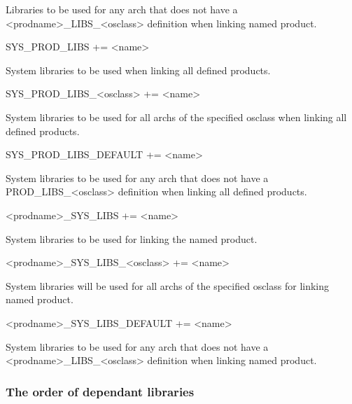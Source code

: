 \begin{description}
Libraries to be used for any arch that does not have a \textless{}prodname\textgreater{}\_LIBS\_\textless{}osclass\textgreater{} definition when linking 
named product.

\item

\item {}SYS\_PROD\_LIBS += \textless{}name\textgreater{}

System libraries to be used when linking all defined products.

\item SYS\_PROD\_LIBS\_\textless{}osclass\textgreater{} += \textless{}name\textgreater{}

System libraries to be used for all archs of the specified osclass when linking all defined products.

\item SYS\_PROD\_LIBS\_DEFAULT += \textless{}name\textgreater{}

System libraries to be used for any arch that does not have a PROD\_LIBS\_\textless{}osclass\textgreater{} definition when 
linking all defined products.

\item \textless{}prodname\textgreater{}\_SYS\_LIBS += \textless{}name\textgreater{}

System libraries to be used for linking the named product.

\item

\item \textless{}prodname\textgreater{}\_SYS\_LIBS\_\textless{}osclass\textgreater{} += \textless{}name\textgreater{}

System libraries will be used for all archs of the specified osclass for linking named product.

\item \textless{}prodname\textgreater{}\_SYS\_LIBS\_DEFAULT += \textless{}name\textgreater{}

System libraries to be used for any arch that does not have a \textless{}prodname\textgreater{}\_LIBS\_\textless{}osclass\textgreater{} definition when 
linking named product.

\end{description}

\subsubsection{The order of dependant libraries}

